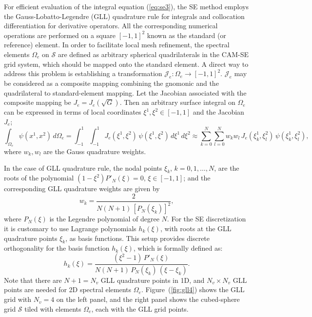  For efficient evaluation of the integral equation (\ref{eq:se3}), the SE  method employs the Gauss-Lobatto-Legendre (GLL) 
  quadrature rule for integrals and collocation differentiation for derivative operators. All the corresponding numerical 
  operations are performed on a square   $[-1,1]^2$ known as  the standard  (or reference) element.   
 In order to facilitate local mesh refinement,   
  the spectral elements  $\Omega_e$  on $\mathcal{S}$ are defined as arbitrary spherical quadrilaterals
  in  the CAM-SE  grid system, which should   be  mapped onto  the standard element.
  A direct  way to address this problem is establishing  %
  a  transformation  $\mathcal{J}_e: \Omega_e \rightarrow [-1,1]^2$.   $\mathcal{J}_e$
  may be considered as   a  composite mapping combining the gnomonic and  the quadrilateral to standard-element mapping.
  Let the Jacobian  associated  with the composite mapping be $J_e = J_e(\sqrt{G})$.
   Then   an  arbitrary surface integral  on $\Omega_e$ can be expressed in terms of local coordinates $\xi^1, \xi^2 \in [-1, 1] $
 and the Jacobian  $J_e$; 
   \begin{equation}
 \int_{\Omega_e} \psi (x^1,x^2) \,  d\Omega_e =   \int_{-1}^{1} \int_{-1}^{1} J_e(\xi^1,\xi^2)  \,  \psi(\xi^1,\xi^2) \, d\xi^1 \, d\xi^2
   \approx   \sum_{k=0}^{N}   \sum_{l=0}^{N} w_k w_l \, J_e(\xi^1_k,\xi^2_l) \,   \psi(\xi^1_k,\xi^2_l),
                               \label{eq:se4} 
 \end{equation} 
 where  $w_k, w_l$  are  the  Gauss  quadrature weights. 
 
 In the  case of GLL quadrature rule, the  nodal points $\xi_k$, $k=0, 1, \dots, N$, 
 are  the roots of  the polynomial $(1-\xi^2) P'_N(\xi) = 0$,
 $\xi \in [-1,1]$;   and the corresponding  GLL quadrature  weights are given by 
 \[   w_k =  \frac{2}{N(N+1) \, [P_N(\xi_k)]^2 },
 \] 
  where  $P_N(\xi)$ is the  Legendre polynomial of degree $N$. 
   For the SE discretization it is customary to use  Lagrange polynomials  $h_k(\xi)$,   with roots at  the 
 GLL   quadrature points $\xi_k$, as basis functions.  This setup provides  discrete orthogonality 
 for  the basis function $h_k(\xi)$,  which   is formally defined as: 
 \begin{equation}
    h_k(\xi) = \frac{ (\xi^2-1)\, P'_N(\xi)}{ N (N+1)\, P_N(\xi_k) \,(\xi-\xi_k)}.   \label{eq:se5}
 \end{equation}
  Note that there are $N+1 = N_v$ GLL quadrature points in 1D,
 and $N_v \times N_v$ GLL points are needed for 2D spectral elements $\Omega_e$. 
 Figure~(\ref{fig:gll4}) shows the GLL grid  with $N_v =4$ on the left panel, 
 and the right panel shows the cubed-sphere grid $\mathcal{S}$ tiled with elements $\Omega_e$,
 each with the GLL  grid points. 
 
